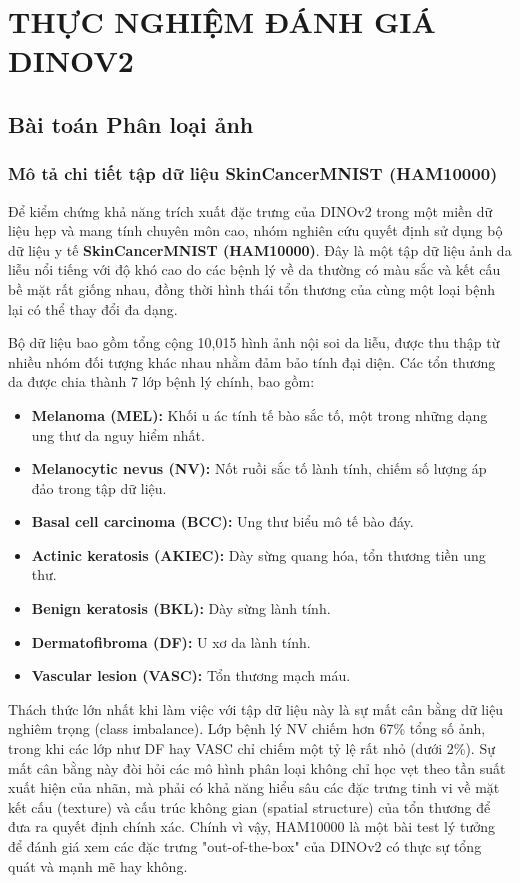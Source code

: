 \chapter{THỰC NGHIỆM ĐÁNH GIÁ DINOV2}

\section{Bài toán Phân loại ảnh}

\subsection{Mô tả chi tiết tập dữ liệu SkinCancerMNIST (HAM10000)}
Để kiểm chứng khả năng trích xuất đặc trưng của DINOv2 trong một miền dữ liệu hẹp và mang tính chuyên môn cao, nhóm nghiên cứu quyết định sử dụng bộ dữ liệu y tế \textbf{SkinCancerMNIST (HAM10000)}. Đây là một tập dữ liệu ảnh da liễu nổi tiếng với độ khó cao do các bệnh lý về da thường có màu sắc và kết cấu bề mặt rất giống nhau, đồng thời hình thái tổn thương của cùng một loại bệnh lại có thể thay đổi đa dạng.

Bộ dữ liệu bao gồm tổng cộng 10,015 hình ảnh nội soi da liễu, được thu thập từ nhiều nhóm đối tượng khác nhau nhằm đảm bảo tính đại diện. Các tổn thương da được chia thành 7 lớp bệnh lý chính, bao gồm:
\begin{itemize}
    \item \textbf{Melanoma (MEL):} Khối u ác tính tế bào sắc tố, một trong những dạng ung thư da nguy hiểm nhất.
    \item \textbf{Melanocytic nevus (NV):} Nốt ruồi sắc tố lành tính, chiếm số lượng áp đảo trong tập dữ liệu.
    \item \textbf{Basal cell carcinoma (BCC):} Ung thư biểu mô tế bào đáy.
    \item \textbf{Actinic keratosis (AKIEC):} Dày sừng quang hóa, tổn thương tiền ung thư.
    \item \textbf{Benign keratosis (BKL):} Dày sừng lành tính.
    \item \textbf{Dermatofibroma (DF):} U xơ da lành tính.
    \item \textbf{Vascular lesion (VASC):} Tổn thương mạch máu.
\end{itemize}

Thách thức lớn nhất khi làm việc với tập dữ liệu này là sự mất cân bằng dữ liệu nghiêm trọng (class imbalance). Lớp bệnh lý NV chiếm hơn 67\% tổng số ảnh, trong khi các lớp như DF hay VASC chỉ chiếm một tỷ lệ rất nhỏ (dưới 2\%). Sự mất cân bằng này đòi hỏi các mô hình phân loại không chỉ học vẹt theo tần suất xuất hiện của nhãn, mà phải có khả năng hiểu sâu các đặc trưng tinh vi về mặt kết cấu (texture) và cấu trúc không gian (spatial structure) của tổn thương để đưa ra quyết định chính xác. Chính vì vậy, HAM10000 là một bài test lý tưởng để đánh giá xem các đặc trưng "out-of-the-box" của DINOv2 có thực sự tổng quát và mạnh mẽ hay không.

